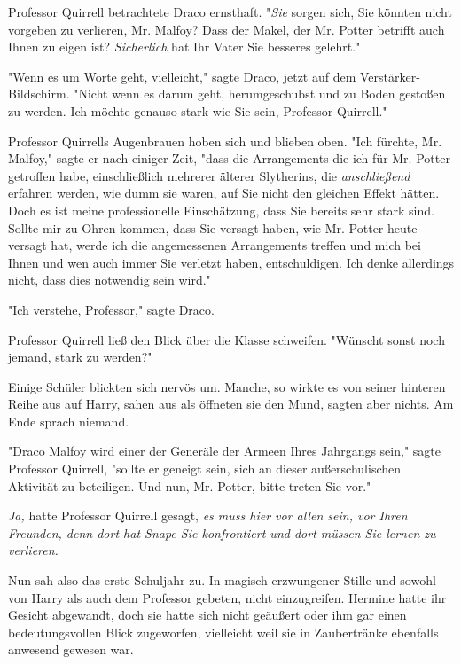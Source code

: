 {Professor Quirrell betrachtete Draco ernsthaft. "\emph{Sie} sorgen sich, Sie könnten nicht vorgeben zu verlieren, Mr. Malfoy? Dass der Makel, der Mr. Potter betrifft auch Ihnen zu eigen ist? \emph{Sicherlich} hat Ihr Vater Sie besseres gelehrt."

"Wenn es um Worte geht, vielleicht," sagte Draco, jetzt auf dem Verstärker-Bildschirm. "Nicht wenn es darum geht, herumgeschubst und zu Boden gestoßen zu werden. Ich möchte genauso stark wie Sie sein, Professor Quirrell."

Professor Quirrells Augenbrauen hoben sich und blieben oben. "Ich fürchte, Mr. Malfoy," sagte er nach einiger Zeit, "dass die Arrangements die ich für Mr. Potter getroffen habe, einschließlich mehrerer älterer Slytherins, die \emph{anschließend} erfahren werden, wie dumm sie waren, auf Sie nicht den gleichen Effekt hätten. Doch es ist meine professionelle Einschätzung, dass Sie bereits sehr stark sind. Sollte mir zu Ohren kommen, dass Sie versagt haben, wie Mr. Potter heute versagt hat, werde ich die angemessenen Arrangements treffen und mich bei Ihnen und wen auch immer Sie verletzt haben, entschuldigen. Ich denke allerdings nicht, dass dies notwendig sein wird."

"Ich verstehe, Professor," sagte Draco.

Professor Quirrell ließ den Blick über die Klasse schweifen. "Wünscht sonst noch jemand, stark zu werden?"

Einige Schüler blickten sich nervös um. Manche, so wirkte es von seiner hinteren Reihe aus auf Harry, sahen aus als öffneten sie den Mund, sagten aber nichts. Am Ende sprach niemand.

"Draco Malfoy wird einer der Generäle der Armeen Ihres Jahrgangs sein," sagte Professor Quirrell, "sollte er geneigt sein, sich an dieser außerschulischen Aktivität zu beteiligen. Und nun, Mr. Potter, bitte treten Sie vor."

\later

\emph{Ja,} hatte Professor Quirrell gesagt, \emph{es muss hier vor allen sein, vor Ihren Freunden, denn dort hat Snape Sie konfrontiert und dort müssen Sie lernen zu verlieren.}

Nun sah also das erste Schuljahr zu. In magisch erzwungener Stille und sowohl von Harry als auch dem Professor gebeten, nicht einzugreifen. Hermine hatte ihr Gesicht abgewandt, doch sie hatte sich nicht geäußert oder ihm gar einen bedeutungsvollen Blick zugeworfen, vielleicht weil sie in Zaubertränke ebenfalls anwesend gewesen war.

}
